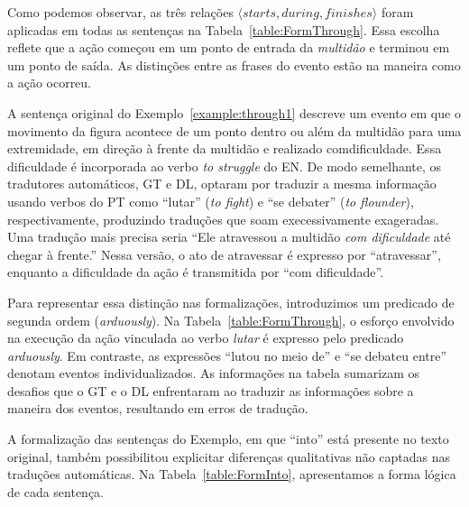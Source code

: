 \documentclass[a4paper, twocolumn, 11pt, twoside]{article}
\begin{document}
  Como podemos observar, as três relações $\langle starts, during, finishes\rangle$ foram aplicadas
  em todas as sentenças na Tabela~\ref{table:FormThrough}. Essa escolha reflete que a ação começou em um ponto de entrada da \textit{multidão} 
  e terminou em um ponto de saída. As distinções entre as frases do evento estão na maneira como a ação ocorreu.

A sentença original do Exemplo~\ref{example:through1} descreve um evento em que o movimento da figura acontece 
de um ponto dentro ou além da multidão para uma extremidade, em direção à frente da multidão e realizado comdificuldade. 
 Essa dificuldade é incorporada ao verbo \textit{to struggle} do EN. De modo semelhante, os tradutores automáticos, GT e DL, 
optaram por traduzir a mesma informação usando verbos do PT como ``lutar'' (\textit{to fight}) e ``se debater'' (\textit{to flounder}),
respectivamente, produzindo traduções que soam execessivamente exageradas. Uma tradução mais precisa seria 
``Ele atravessou a multidão \emph{com dificuldade} até chegar à frente.'' Nessa versão, o ato de atravessar é expresso por ``atravessar'', 
enquanto a dificuldade da ação é transmitida por ``com dificuldade''.

Para representar essa distinção nas formalizações, introduzimos um predicado de segunda ordem (\textit{arduously}). 
Na Tabela~\ref{table:FormThrough}, o esforço envolvido na execução da ação vinculada ao verbo \textit{lutar} é expresso pelo predicado \textit{arduously}. 
Em contraste, as expressões ``lutou no meio de'' e ``se debateu entre'' denotam eventos individualizados. As informações na tabela sumarizam os desafios que o GT e o DL enfrentaram ao traduzir as informações sobre a maneira dos eventos, 
resultando em erros de tradução. 

A formalização das sentenças do Exemplo, em que ``into'' está presente no texto original, também possibilitou explicitar 
diferenças qualitativas não captadas nas traduções automáticas. Na Tabela~\ref{table:FormInto}, apresentamos a forma lógica de cada 
sentença.
\end{document}
